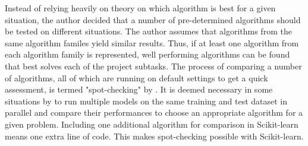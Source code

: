 	Instead of relying heavily on theory on which algorithm is best for a given situation, the author decided that a number of pre-determined algorithms should be tested on different situations. The author assumes that algorithms from the same algorithm familes yield similar results. Thus, if at least one algorithm from each algorithm family is represented, well performing algorithms can be found that best solves each of the project subtasks. The process of comparing a number of algorithms, all of which are running on default settings to get a quick assessment, is termed "spot-checking" by \cite{WEBSITE:26}. It is deemed necessary in some situations by \cite{BOOK:6} to run multiple models on the same training and test dataset in parallel and compare their performances to choose an appropriate algorithm for a given problem. Including one additional algorithm for comparison in Scikit-learn means one extra line of code. This makes spot-checking possible with Scikit-learn. 

